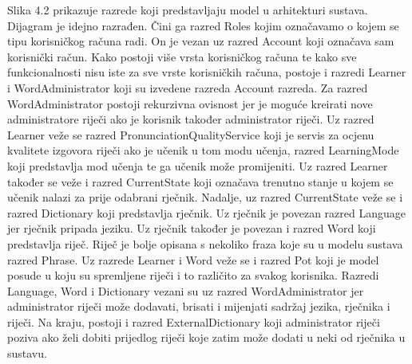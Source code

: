 			Slika 4.2 prikazuje razrede koji predstavljaju model u arhitekturi sustava. Dijagram je idejno razrađen. Čini ga razred Roles kojim označavamo o kojem se tipu korisničkog računa radi. On je vezan uz razred Account koji označava sam korisnički račun. Kako postoji više vrsta korisničkog računa te kako sve funkcionalnosti nisu iste za sve vrste korisničkih računa, postoje i razredi Learner i WordAdministrator koji su izvedene razreda Account razreda. Za razred WordAdministrator postoji rekurzivna ovisnost jer je moguće kreirati nove administratore riječi ako je korisnik također administrator riječi. Uz razred Learner veže se razred PronunciationQualityService koji je servis za ocjenu kvalitete izgovora riječi ako je učenik u tom modu učenja, razred LearningMode koji predstavlja mod učenja te ga učenik može promijeniti. Uz razred Learner također se veže i razred CurrentState koji označava trenutno stanje u kojem se učenik nalazi za prije odabrani rječnik. Nadalje, uz razred CurrentState veže se i razred Dictionary koji predstavlja rječnik. Uz rječnik je povezan razred Language jer rječnik pripada jeziku. Uz rječnik također je povezan i razred Word koji predstavlja riječ. Riječ je bolje opisana s nekoliko fraza koje su u modelu sustava razred Phrase. Uz razrede Learner i Word veže se i razred Pot koji je model posude u koju su spremljene riječi i to različito za svakog korisnika. Razredi Language, Word i Dictionary vezani su uz razred WordAdministrator jer administrator riječi može dodavati, brisati i mijenjati sadržaj jezika, rječnika i riječi. Na kraju, postoji i razred ExternalDictionary koji administrator riječi poziva ako želi dobiti prijedlog riječi koje zatim može dodati u neki od rječnika u sustavu. \newpage
			
